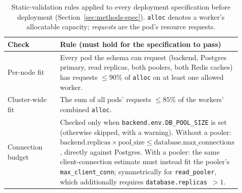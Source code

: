 \begin{table}[htbp]
  \centering
  \caption{Static-validation rules applied to every deployment
    specification before deployment (Section~\ref{sec:methods-spec}).
    \texttt{alloc} denotes a worker's allocatable capacity; \emph{requests}
    are the pod's resource requests.}
  \label{tab:appendix-spec-validation}
  \small
  \begin{tabular}{@{}p{0.24\linewidth}p{0.68\linewidth}@{}}
    \toprule
    \textbf{Check} & \textbf{Rule (must hold for the specification to pass)} \\
    \midrule
    Per-node fit &
      Every pod the schema can request (backend, Postgres primary, read
      replicas, both poolers, both Redis caches) has requests
      $\leq 90\%$ of \texttt{alloc} on at least one allowed worker. \\
    Cluster-wide fit &
      The sum of all pods' requests $\leq 85\%$ of the workers' combined
      \texttt{alloc}. \\
    Connection budget &
      Checked only when \texttt{backend.env.DB\_POOL\_SIZE} is set
      (otherwise skipped, with a warning). Without a pooler:
      $\text{backend.replicas} \times \text{pool\_size} \leq
      \text{database.max\_connections}$, directly against Postgres. With a
      pooler: the same client-connection estimate must instead fit the
      pooler's \texttt{max\_client\_conn}; symmetrically for
      \texttt{read\_pooler}, which additionally requires
      \texttt{database.replicas}~$>1$. \\
    \bottomrule
  \end{tabular}
\end{table}

